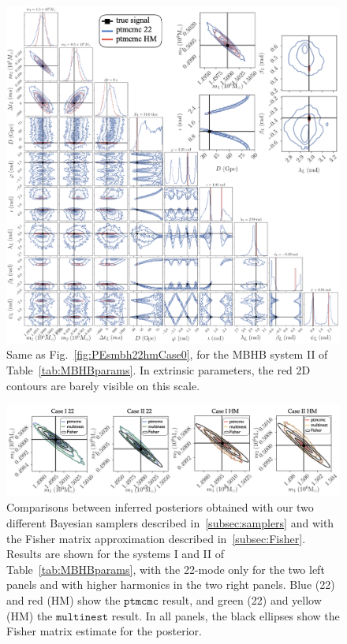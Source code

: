 \documentclass[aps,showpacs,twocolumn,prd,superscriptaddress,nofootinbib]{revtex4-1}
\begin{document}
\begin{figure}
  \centering
  \includegraphics[width=.98\linewidth]{../plots/corner_smbh_case9_ptmcmc_22_hm_withzoom.png}
  \caption{Same as Fig.~\ref{fig:PEsmbh22hmCase0}, for the MBHB system II of Table~\ref{tab:MBHBparams}. In extrinsic parameters, the red 2D contours are barely visible on this scale.}
  \label{fig:PEsmbh22hmCase9}
\end{figure}

\begin{figure}
  \centering
  \includegraphics[width=.98\linewidth]{../plots/row_m1m2_ptmcmc_bambi.png}
  \caption{Comparisons between inferred posteriors obtained with our two different Bayesian samplers described in~\ref{subsec:samplers} and with the Fisher matrix approximation described in~\ref{subsec:Fisher}. Results are shown for the systems I and II of Table~\ref{tab:MBHBparams}, with the 22-mode only for the two left panels and with higher harmonics in the two right panels. Blue (22) and red (HM) show the $\texttt{ptmcmc}$ result, and green (22) and yellow (HM) the $\texttt{multinest}$ result. In all panels, the black ellipses show the Fisher matrix estimate for the posterior.}
  \label{fig:PEsmbhm1m2ptmcmcbambi}
\end{figure}
\end{document}
